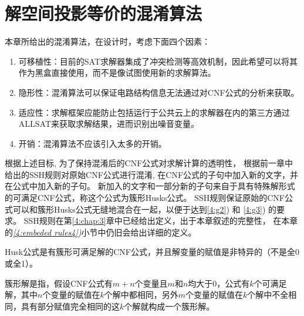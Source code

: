 \section{解空间投影等价的混淆算法}
本章所给出的混淆算法，在设计时，考虑下面四个因素：

\begin{enumerate}
 \item
可移植性：目前的SAT求解器集成了冲突检测等高效机制，因此希望可以将其作为黑盒直接使用，而不是像\cite{OBfuscationd-CNFs}试图使用新的求解算法。
 \item \label{4:g2}
隐形性\cite{obfuscationBible}：混淆算法可以保证电路结构信息无法通过对CNF公式的分析来获取。
\item \label{4:g3}
适应性\cite{obfuscationBible}：求解框架应能防止包括运行于公共云上的求解器在内的第三方通过ALLSAT来获取求解结果，进而识别出噪音变量。
 \item
开销：混淆算法不应该引入太多的开销。
\end{enumerate}
根据上述目标,
为了保持混淆后的CNF公式对求解计算的透明性，
根据前一章中给出的SSH规则对原始CNF公式进行混淆,
在CNF公式的子句中加入新的文字，并在公式中加入新的子句。
新加入的文字和一部分新的子句来自于具有特殊解形式的可满足CNF公式，称这个公式为簇形Husks公式。
SSH规则保证原始的CNF公式可以和簇形Husks公式无缝地混合在一起，以便于达到\ref{4:g2}) 和 \ref{4:g3}) 的要求。
SSH规则在第\ref{4:chap:3}章中已经给出定义，出于本章叙述的完整性，
在本章的\textit{\ref{4:embeded rules4})}小节中仍旧会给出详细的定义。

\begin{definition}[簇形Husks 公式]\label{4:Husks-formula-definition}
Husk公式是有簇形可满足解的CNF公式，并且解变量的赋值是非特异的（不是全0或全1）。
\end{definition}

\begin{definition}[簇形解]\label{4:Husks-Solution-definition}
簇形解是指，假设CNF公式有$m+n$个变量且$m$和$n$均大于0，公式有$k$个可满足解，其中$n$个变量的赋值在$k$个解中都相同，另外$m$个变量的赋值在$k$个解中不全相同，具有部分赋值完全相同的这$k$个解就构成一个簇形解。
\end{definition}

